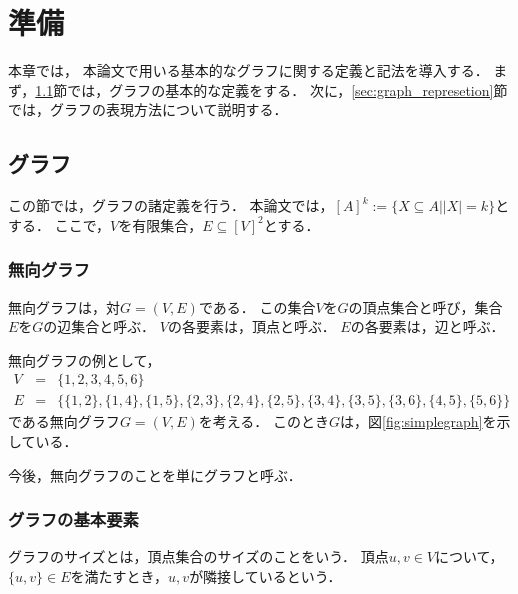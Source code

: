 \chapter{準備}
\label{ch:prelm}

本章では，
本論文で用いる基本的なグラフに関する定義と記法を導入する．
まず，\ref{sec:graph}節では，グラフの基本的な定義をする．
次に，\ref{sec:graph_represetion}節では，グラフの表現方法について説明する．
\section{グラフ}
\label{sec:graph}
この節では，グラフの諸定義を行う．
本論文では，$[A]^k := \{ X \subseteq A | |X| = k \}$とする．
ここで，$V$を有限集合，$E \subseteq [V]^2$とする．

\subsection*{無向グラフ}
無向グラフは，対$G=(V,E)$である．
この集合$V$を$G$の頂点集合と呼び，集合$E$を$G$の辺集合と呼ぶ．
$V$の各要素は，頂点と呼ぶ．
$E$の各要素は，辺と呼ぶ．%

無向グラフの例として，
\begin{eqnarray*}
    V &=& \{ 1,2,3,4,5,6 \} \\
    E &=& \{ \{1,2\},\{1,4\}, \{1,5\},\{2,3\},\{2,4\},\{2,5\},\{3,4\},\{3,5\},\{3,6\},\{4,5\},\{5,6\} \}
\end{eqnarray*}
である無向グラフ$G=(V,E)$を考える．
このとき$G$は，図\ref{fig:simplegraph}を示している．

今後，無向グラフのことを単にグラフと呼ぶ．
\subsection*{グラフの基本要素}
グラフのサイズとは，頂点集合のサイズのことをいう．
頂点$u,v\in V$について，$ \{u,v \} \in E $を満たすとき，$u,v$が隣接しているという．

